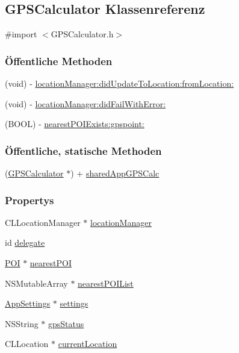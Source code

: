 \hypertarget{interface_g_p_s_calculator}{
\subsection{GPSCalculator Klassenreferenz}
\label{interface_g_p_s_calculator}
}


{\ttfamily \#import $<$GPSCalculator.h$>$}\subsubsection*{Öffentliche Methoden}
\begin{DoxyCompactItemize}
\item 
(void) -\/ \hyperlink{interface_g_p_s_calculator_ace4b565a8dca496da97ca7e890226136}{locationManager:didUpdateToLocation:fromLocation:}
\item 
(void) -\/ \hyperlink{interface_g_p_s_calculator_a172bfe3f489df71bd558a074770caf71}{locationManager:didFailWithError:}
\item 
(BOOL) -\/ \hyperlink{interface_g_p_s_calculator_a406a446181f898802d323447150b0f67}{nearestPOIExists:gpspoint:}
\end{DoxyCompactItemize}
\subsubsection*{Öffentliche, statische Methoden}
\begin{DoxyCompactItemize}
\item 
(\hyperlink{interface_g_p_s_calculator}{GPSCalculator} $\ast$) + \hyperlink{interface_g_p_s_calculator_a76b80925729654bc60faecb2a93e1877}{sharedAppGPSCalc}
\end{DoxyCompactItemize}
\subsubsection*{Propertys}
\begin{DoxyCompactItemize}
\item 
CLLocationManager $\ast$ \hyperlink{interface_g_p_s_calculator_abe4f902d1cb7d075967dc769d0b15133}{locationManager}
\item 
id \hyperlink{interface_g_p_s_calculator_a0afb0a146e7dc7b16a6a51dc3eb69fc3}{delegate}
\item 
\hyperlink{interface_p_o_i}{POI} $\ast$ \hyperlink{interface_g_p_s_calculator_adb62c6bc9c85129145d61bd272ed8ec4}{nearestPOI}
\item 
NSMutableArray $\ast$ \hyperlink{interface_g_p_s_calculator_ad35926f5862c782550e8fb53c72d9ce7}{nearestPOIList}
\item 
\hyperlink{interface_app_settings}{AppSettings} $\ast$ \hyperlink{interface_g_p_s_calculator_a16945732145e0f6c1541b57c7a9bf50e}{settings}
\item 
NSString $\ast$ \hyperlink{interface_g_p_s_calculator_a437060e217fe7ab21e7738a19c2c9238}{gpsStatus}
\item 
CLLocation $\ast$ \hyperlink{interface_g_p_s_calculator_ae9268fe3bb4bfc41efa35f108fe346a0}{currentLocation}
\end{DoxyCompactItemize}


